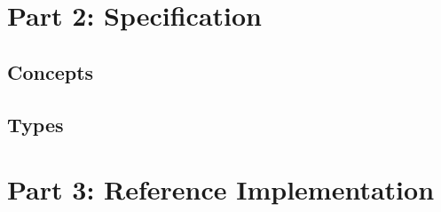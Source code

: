 \documentclass[draft]{scrspec}
\begin{document}
%
%

\part{Part 2: Specification}

\chapter{Concepts}


\chapter{Types}



%
%

\part{Part 3:  Reference Implementation}

\end{document}
